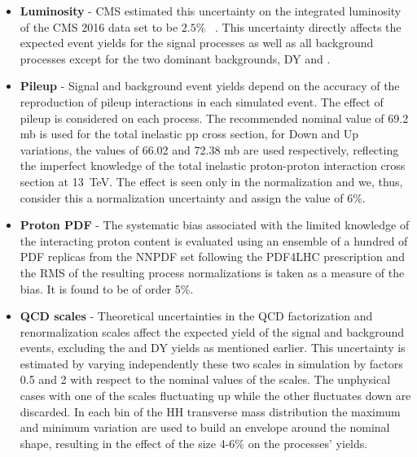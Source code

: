 \begin{itemize}

\item{\bfseries Luminosity} - CMS estimated this uncertainty on the integrated
  luminosity of the CMS 2016 data set to be $2.5\%$
  ~\cite{CMS-PAS-LUM-17-001}. This uncertainty directly affects the
  expected event yields for the signal processes as well as all
  background processes except for the two dominant backgrounds, DY and
  \ttbar. %

\item{\bfseries Pileup} - Signal and background event yields depend on the
  accuracy of the reproduction of pileup interactions in each simulated event. The effect of pileup is considered on each process. The recommended nominal value of 69.2 mb is used for the total inelastic pp cross section, for Down and Up variations, the values of 66.02 and 72.38 mb are used respectively, reflecting the imperfect knowledge of the total inelastic
  proton-proton interaction cross section at 13~TeV. The effect is seen only in the normalization and we, thus, consider this a normalization uncertainty and assign the value of $6\%$.

\item{\bfseries Proton PDF} - The systematic bias associated with the limited
  knowledge of the interacting proton content is evaluated using an ensemble of a hundred of PDF
  replicas from the NNPDF set \cite{Ball:2014uwa} following the
  PDF4LHC prescription \cite{Botje:2011sn,Alekhin:2011sk} and the RMS
  of the resulting process normalizations is taken as a measure of the
  bias. It is found to be of order 5\%.

\item{\bfseries QCD scales} - Theoretical uncertainties in the QCD
  factorization and renormalization scales affect the expected yield
  of the signal and background events, excluding the \ttbar and DY
  yields as mentioned earlier. This uncertainty is estimated
  by varying independently these two scales in simulation by factors 0.5 and 2 with respect to the nominal
  values of the scales. The unphysical cases with one of the scales
  fluctuating up while the other fluctuates down are discarded. In
  each bin of the HH transverse mass distribution the maximum and
  minimum variation are used to build an envelope around the nominal
  shape, resulting in the effect of the size 4-6\% on the processes' yields.


\end{itemize}
